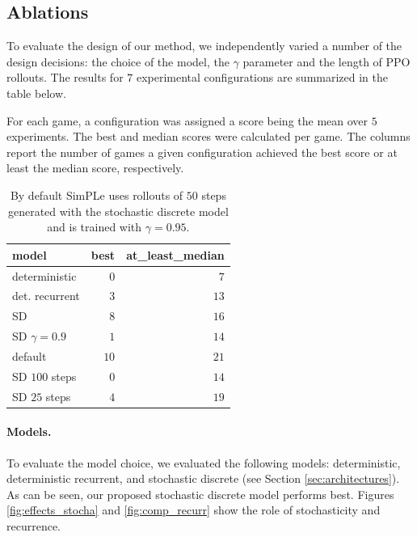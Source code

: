 \subsection{Ablations}\label{sec:ablations}

To evaluate the design of our method, we independently varied a number of the design decisions: the choice of the model, the $\gamma$ parameter and the length of PPO rollouts. The results for $7$ experimental configurations are summarized in the table below. 

For each game, a configuration was assigned a score being the mean over $5$ experiments. The best and median scores were calculated per game. The columns report the number of games a given configuration achieved the best score or at least the median score, respectively. 

\begin{table}[t]
\begin{center} 
  \begin{tabular}{lrr}\label{tab:ab}
model  &  best &  at\_least\_median \\
\midrule
deterministic       &     $0$ &                $7$ \\
det. recurrent  &     $3$ &               $13$ \\
SD         &     $8$ &               $16$ \\
SD $\gamma=0.9$     &     $1$ &               $14$ \\
default     &     $10$ &               $21$ \\
SD $100$ steps    &     $0$ &               $14$ \\
SD $25$ steps     &     $4$ &               $19$ \\
\end{tabular} 
\end{center}
\caption{By default SimPLe uses rollouts of $50$ steps  generated with the stochastic discrete model and is trained with $\gamma=0.95$.}
\end{table}

\paragraph{Models.} To evaluate the model choice, we evaluated the following models: deterministic, deterministic recurrent, and stochastic discrete (see Section \ref{sec:architectures}). As can be seen, our proposed stochastic discrete model performs best. Figures \ref{fig:effects_stocha} and \ref{fig:comp_recurr} show the role of stochasticity and recurrence.  


